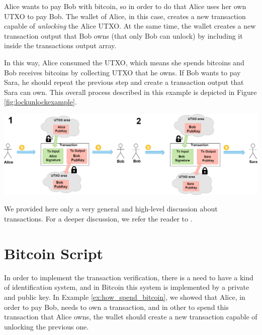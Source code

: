 \begin{example}\label{ex:how_spend_bitcoin}
    Alice wants to pay Bob with bitcoin, so in order to do that Alice
    uses her own UTXO to pay Bob. The wallet of Alice, in this case, creates a new transaction
    capable of \emph{unlocking} the Alice UTXO. At the same time, the wallet creates 
    a new transaction output that Bob owns (that only Bob can unlock) by including it inside the transactions output array. 

    In this way, Alice consumed the UTXO, which means she spends bitcoins and Bob receives bitcoins by collecting UTXO that he owns. 
    If Bob wants to pay Sara, he should repeat the previous step and create a transaction output that Sara can own. This overall process described in this example is depicted in  Figure \ref{fig:lockunlockexample}.

    {\centering
     \vspace{5pt}
      \includegraphics[scale=0.3]{imgs/DiagramUnlocLockUTXO.png}
      \vspace{10pt}
     \par}
\end{example}


We provided here only a very general and high-level discussion about transactions. For a deeper discussion, we refer the reader to \cite{Palazzo_Estrazione_di_Informazioni_2021}.

\section{Bitcoin Script}

In order to implement the transaction verification, there is a need to have
a kind of identification system, and in Bitcoin this system is implemented by a private and public key.
In Example \ref{ex:how_spend_bitcoin}, we showed  that Alice, in order to pay Bob, needs to 
own a transaction, and in other to spend this transaction that Alice owns, the wallet should
create a new transaction capable of unlocking the previous one. 

